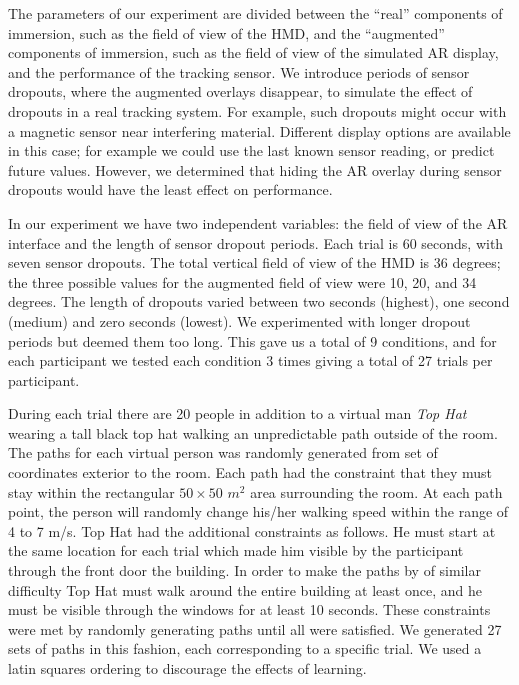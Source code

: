 \documentclass{acmsiggraph}                     %
\begin{document}
The parameters of our experiment are divided between the ``real'' components of immersion, such as the field of view of the HMD, and the ``augmented'' components of immersion, such as the field of view of the simulated AR display, and the performance of the tracking sensor.  We introduce periods of sensor dropouts, where the augmented overlays disappear, to simulate the effect of dropouts in a real tracking system.  For example, such dropouts might occur with a magnetic sensor near interfering material.  Different display options are available in this case; for example we could use the last known sensor reading, or predict future values.
However, we determined that hiding the AR overlay during sensor dropouts would have the least effect on performance.

In our experiment we have two independent variables: the field of view of the AR interface and the length of sensor dropout periods.  Each trial is 60 seconds, with seven sensor dropouts.  The total vertical field of view of the HMD is 36 degrees; the three possible values for the augmented field of view were 10, 20, and 34 degrees.  The length of dropouts varied between two seconds (highest), one second (medium) and zero seconds (lowest).  We experimented with longer dropout periods but deemed them too long.  This gave us a total of 9 conditions, and for each participant we tested each condition 3 times giving a total of 27 trials per participant.

During each trial there are 20 people in addition to a virtual man \emph{Top Hat} wearing a tall black top hat walking an unpredictable path outside of the room.  The paths for each virtual person was randomly generated from set of coordinates exterior to the room.  Each path had the constraint that they must stay within the rectangular $50\times50$ $m^2$ area surrounding the room.  At each path point, the person will randomly change his/her walking speed within the range of 4 to 7 m/s.  Top Hat had the additional constraints as follows.  He must start at the same location for each trial which made him visible by the participant through the front door the building.  In order to make the paths by of similar difficulty Top Hat must walk around the entire building at least once, and he must be visible through the windows for at least 10 seconds.  These constraints were met by randomly generating paths until all were satisfied.  We generated 27 sets of paths in this fashion, each corresponding to a specific trial.  We used a latin squares ordering to discourage the effects of learning.
\end{document}
